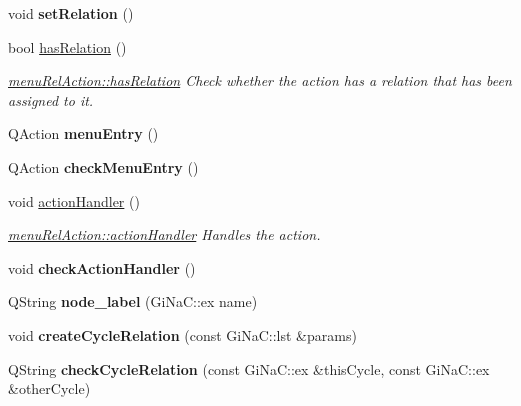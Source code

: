 \begin{DoxyCompactItemize}
\mbox{\label{classmenu_rel_action_acba36fb50f54a72a4b253957f2f50f92}} 
void {\bfseries set\+Relation} ()
\item 
bool \mbox{\hyperlink{classmenu_rel_action_a5e6339dbaf4cf0dc9543afdfc5b9e15a}{has\+Relation}} ()
\begin{DoxyCompactList}\small\item\em \mbox{\hyperlink{classmenu_rel_action_a5e6339dbaf4cf0dc9543afdfc5b9e15a}{menu\+Rel\+Action\+::has\+Relation}} Check whether the action has a relation that has been assigned to it. \end{DoxyCompactList}\item 
\mbox{\label{classmenu_rel_action_af3463f9fd28cf1ff44c672dedb89af95}} 
Q\+Action {\bfseries menu\+Entry} ()
\item 
\mbox{\label{classmenu_rel_action_a9c40a2e1e1538829214a2a9e06896a99}} 
Q\+Action {\bfseries check\+Menu\+Entry} ()
\item 
void \mbox{\hyperlink{classmenu_rel_action_a23b63e5bdb79e12f74bd1d33a53fb6e0}{action\+Handler}} ()
\begin{DoxyCompactList}\small\item\em \mbox{\hyperlink{classmenu_rel_action_a23b63e5bdb79e12f74bd1d33a53fb6e0}{menu\+Rel\+Action\+::action\+Handler}} Handles the action. \end{DoxyCompactList}\item 
\mbox{\label{classmenu_rel_action_a1535eb0d2ad06bd4d44f3de8761841b2}} 
void {\bfseries check\+Action\+Handler} ()
\item 
\mbox{\label{classmenu_rel_action_a157ae072f7e1622564ff68583bb73132}} 
Q\+String {\bfseries node\+\_\+label} (Gi\+Na\+C\+::ex name)
\item 
\mbox{\label{classmenu_rel_action_a458e0e91f6125a4d16c369d140000e77}} 
void {\bfseries create\+Cycle\+Relation} (const Gi\+Na\+C\+::lst \&params)
\item 
\mbox{\label{classmenu_rel_action_ab3a724c2d09de8a3d253210ec3a0e0d3}} 
Q\+String {\bfseries check\+Cycle\+Relation} (const Gi\+Na\+C\+::ex \&this\+Cycle, const Gi\+Na\+C\+::ex \&other\+Cycle)
\end{DoxyCompactItemize}
